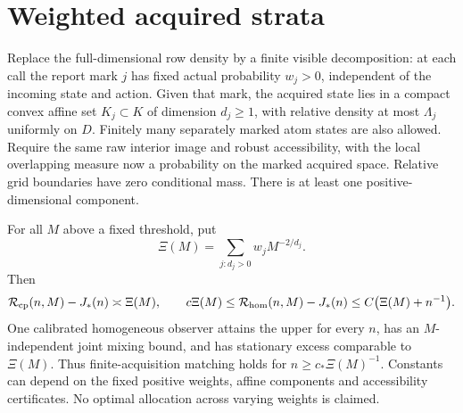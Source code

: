 \section{Weighted acquired strata}\label{sec:strata}
\begin{theorem}\label{thm:strata}
Replace the full-dimensional row density by a finite visible decomposition: at each call the report mark $j$ has fixed actual probability $w_j>0$, independent of the incoming state and action. Given that mark, the acquired state lies in a compact convex affine set $K_j\subset K$ of dimension $d_j\ge1$, with relative density at most $\Lambda_j$ uniformly on $D$. Finitely many separately marked atom states are also allowed. Require the same raw interior image and robust accessibility, with the local overlapping measure now a probability on the marked acquired space. Relative grid boundaries have zero conditional mass. There is at least one positive-dimensional component.

For all $M$ above a fixed threshold, put
\begin{equation}\label{eq:xi}
 \Xi(M)=\sum_{j:d_j>0}w_jM^{-2/d_j}.
\end{equation}
Then
\begin{equation}\label{eq:stratified-law}
 \mathcal R_{\rm cp}(n,M)-J_*(n)\asymp\Xi(M),\qquad
 c\Xi(M)\le\mathcal R_{\rm hom}(n,M)-J_*(n)
       \le C\bigl(\Xi(M)+n^{-1}\bigr).
\end{equation}
One calibrated homogeneous observer attains the upper for every $n$, has an $M$-independent joint mixing bound, and has stationary excess comparable to $\Xi(M)$. Thus finite-acquisition matching holds for $n\ge c_*\Xi(M)^{-1}$. Constants can depend on the fixed positive weights, affine components and accessibility certificates. No optimal allocation across varying weights is claimed.
\end{theorem}
